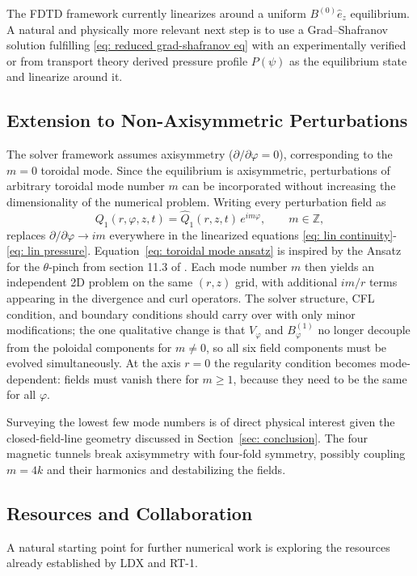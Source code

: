 The FDTD framework currently linearizes around a uniform $B^{(0)}\hat{e}_z$
equilibrium.
A natural and physically more relevant next step is to use a Grad–Shafranov
solution fulfilling \eqref{eq: reduced grad-shafranov eq} with an experimentally
verified or from transport theory derived pressure profile $P(\psi)$ as the equilibrium state
and linearize around it.

\subsection{Extension to Non-Axisymmetric Perturbations}
\label{subsec: non-axisymmetric perturbations}

The solver framework assumes axisymmetry ($\partial/\partial\varphi=0$), corresponding
to the $m=0$ toroidal mode.
Since the equilibrium is axisymmetric, perturbations of arbitrary toroidal mode number
$m$ can be incorporated without increasing the dimensionality of the numerical problem.
Writing every perturbation field as
\begin{equation}
    Q_1(r,\varphi,z,t) = \hat{Q}_1(r,z,t)\,e^{im\varphi}, \qquad m\in\mathbb{Z},
    \label{eq: toroidal mode ansatz}
\end{equation}
replaces $\partial/\partial\varphi\to im$ everywhere in the linearized equations
\eqref{eq: lin continuity}-\eqref{eq: lin pressure}. Equation~\eqref{eq: toroidal mode ansatz} is inspired by the Ansatz for the
$\theta$-pinch from section 11.3 of \cite{Freidberg2014}.
Each mode number $m$ then yields an independent 2D problem on the same $(r,z)$ grid,
with additional $im/r$ terms appearing in the divergence and curl operators.
The solver structure, CFL condition, and boundary conditions should carry over with only minor
modifications; the one qualitative change is that $V_\varphi$ and $B^{(1)}_\varphi$
no longer decouple from the poloidal components for $m\neq 0$, so all six field
components must be evolved simultaneously.
At the axis $r=0$ the regularity condition becomes mode-dependent: fields must vanish
there for $m\geq 1$, because they need to be the same for all $\varphi$.

Surveying the lowest few mode numbers is of direct physical interest given the
closed-field-line geometry discussed in Section~\ref{sec: conclusion}.
The four magnetic tunnels break axisymmetry with four-fold symmetry, possibly coupling $m=4k$
and their harmonics and destabilizing the fields.
\subsection{Resources and Collaboration}
\label{subsec: resources}
A natural starting point for further numerical work is exploring the resources
already established by LDX and RT-1.

